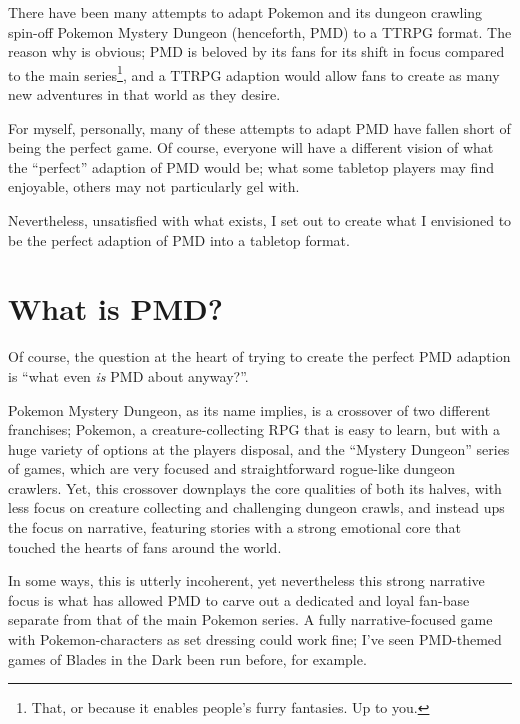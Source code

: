 \documentclass[
  11pt,
  letterpaper,
]{scrbook}
\begin{document}

There have been many attempts to adapt Pokemon and its dungeon crawling
spin-off Pokemon Mystery Dungeon (henceforth, PMD) to a TTRPG format.
The reason why is obvious; PMD is beloved by its fans for its shift in
focus compared to the main series\footnote{That, or because it enables
  people's furry fantasies. Up to you.}, and a TTRPG adaption would
allow fans to create as many new adventures in that world as they
desire.

For myself, personally, many of these attempts to adapt PMD have fallen
short of being the perfect game. Of course, everyone will have a
different vision of what the ``perfect'' adaption of PMD would be; what
some tabletop players may find enjoyable, others may not particularly
gel with.

Nevertheless, unsatisfied with what exists, I set out to create what I
envisioned to be the perfect adaption of PMD into a tabletop format.

\newpage

\section*{What is PMD?}\label{what-is-pmd}


Of course, the question at the heart of trying to create the perfect PMD
adaption is ``what even \emph{is} PMD about anyway?''.

Pokemon Mystery Dungeon, as its name implies, is a crossover of two
different franchises; Pokemon, a creature-collecting RPG that is easy to
learn, but with a huge variety of options at the players disposal, and
the ``Mystery Dungeon'' series of games, which are very focused and
straightforward rogue-like dungeon crawlers. Yet, this crossover
downplays the core qualities of both its halves, with less focus on
creature collecting and challenging dungeon crawls, and instead ups the
focus on narrative, featuring stories with a strong emotional core that
touched the hearts of fans around the world.

In some ways, this is utterly incoherent, yet nevertheless this strong
narrative focus is what has allowed PMD to carve out a dedicated and
loyal fan-base separate from that of the main Pokemon series. A fully
narrative-focused game with Pokemon-characters as set dressing could
work fine; I've seen PMD-themed games of Blades in the Dark been run
before, for example.
\end{document}
